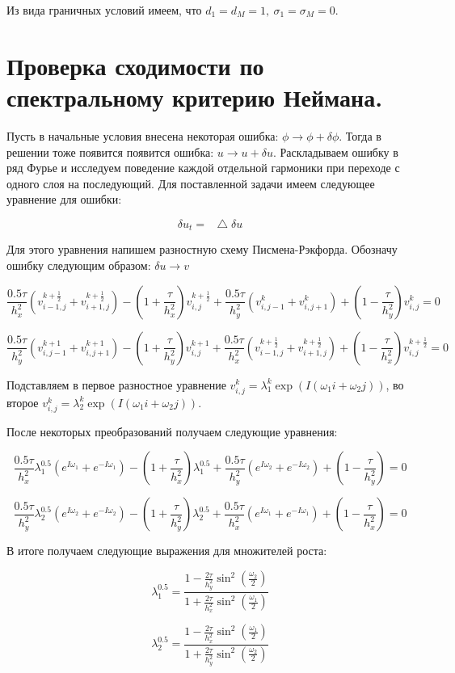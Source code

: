 \documentclass[a4paper,14pt]{article}
\newcommand*\Laplace{\mathop{}\!\mathbin\bigtriangleup}
\begin{document}
\noindent Из вида граничных условий имеем, что $d_1 = d_M = 1, \ \sigma_1 = \sigma_M = 0$.

\section{Проверка сходимости по спектральному критерию Неймана.}
Пусть в начальные условия внесена некоторая ошибка: $\phi \rightarrow \phi + \delta \phi$. Тогда в решении тоже появится появится ошибка: $u \rightarrow u + \delta u$. Раскладываем ошибку в ряд Фурье и исследуем поведение каждой отдельной гармоники при переходе с одного слоя на последующий. Для поставленной задачи имеем следующее уравнение для ошибки:

$$\delta u_t = \Laplace \delta u$$

Для этого уравнения напишем разностную схему Писмена-Рэкфорда. Обозначу ошибку следующим образом: $\delta u \rightarrow v$

$$\frac{0.5 \tau}{h_x^2} (v_{i-1,j}^{k+\frac{1}{2}} + v_{i+1,j}^{k+\frac{1}{2}}) - (1+\frac{\tau}{h_x^2})v_{i,j}^{k+\frac{1}{2}} + \frac{0.5 \tau}{h_y^2} (v_{i,j-1}^{k}+v_{i,j+1}^{k})+(1-\frac{\tau}{h_y^2})v_{i,j}^{k}=0$$

$$\frac{0.5 \tau}{h_y^2} (v_{i,j-1}^{k+1} + v_{i,j+1}^{k+1})- (1+\frac{\tau}{h_y^2})v_{i,j}^{k+1} + \frac{0.5 \tau}{h_x^2} (v_{i-1,j}^{k+\frac{1}{2}}+v_{i+1,j}^{k+\frac{1}{2}})+(1-\frac{\tau}{h_x^2})v_{i,j}^{k+\frac{1}{2}} = 0$$

\noindent Подставляем в первое разностное уравнение $v_{i,j}^k = \lambda^{k}_1 \exp(I(\omega_1 i + \omega_2 j))$, во второе $v_{i,j}^k = \lambda^{k}_2 \exp(I(\omega_1 i + \omega_2 j))$.

После некоторых преобразований получаем следующие уравнения:

$$\frac{0.5 \tau}{h_x^2} \lambda^{0.5}_1(e^{I \omega_1}+e^{-I \omega_1})-(1+\frac{\tau}{h_x^2})\lambda^{0.5}_1+\frac{0.5 \tau}{h_y^2} (e^{I \omega_2}+e^{-I \omega_2})+(1-\frac{\tau}{h_y^2})=0$$

$$\frac{0.5 \tau}{h_y^2} \lambda^{0.5}_2(e^{I \omega_2}+e^{-I \omega_2})-(1+\frac{\tau}{h_y^2})\lambda^{0.5}_2+\frac{0.5 \tau}{h_x^2} (e^{I \omega_1}+e^{-I \omega_1})+(1-\frac{\tau}{h_x^2})=0$$

В итоге получаем следующие выражения для множителей роста:

$$\lambda_1^{0.5} = \frac{1-\frac{2\tau}{h_y^2} \sin^2(\frac{\omega_2}{2})}{1+\frac{2\tau}{h_x^2} \sin^2(\frac{\omega_1}{2})}$$

$$\lambda_2^{0.5} = \frac{1-\frac{2\tau}{h_x^2} \sin^2(\frac{\omega_1}{2})}{1+\frac{2\tau}{h_y^2} \sin^2(\frac{\omega_2}{2})}$$
\end{document}
